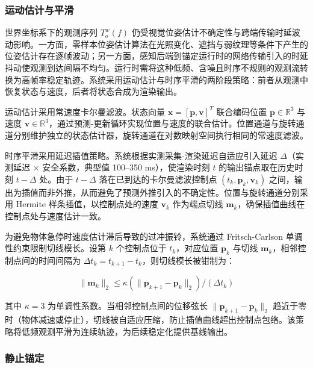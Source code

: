 \documentclass[review]{vgtc}
\begin{document}
\subsubsection{运动估计与平滑}\label{sec:smoothing}


世界坐标系下的观测序列 ${T_o^w (f)}$ 仍受视觉位姿估计不确定性与跨端传输时延波动影响。一方面，零样本位姿估计算法在光照变化、遮挡与弱纹理等条件下产生的位姿估计存在逐帧波动；另一方面，感知后端到锚定运行时的网络传输引入的时延抖动使观测到达间隔不均匀。运行时需将这种低频、含噪且时序不规则的观测流转换为高帧率稳定轨迹。系统采用运动估计与时序平滑的两阶段策略：前者从观测中恢复状态与速度，后者将状态合成为渲染输出。

运动估计采用常速度卡尔曼滤波。状态向量 $\mathbf{x} = [\mathbf{p}, \mathbf{v}]^T$ 联合编码位置 $\mathbf{p} \in \mathbb{R}^3$ 与速度 $\mathbf{v} \in \mathbb{R}^3$，通过预测-更新循环实现位置与速度的联合估计。位置通道与旋转通道分别维护独立的状态估计器，旋转通道在对数映射空间执行相同的常速度滤波。

时序平滑采用延迟插值策略。系统根据实测采集-渲染延迟自适应引入延迟 $\Delta$（实测延迟 $\times$ 安全系数，典型值 100--350 ms），使渲染时刻 $t$ 的输出锚点取在历史时刻 $t - \Delta$ 处。由于 $t - \Delta$ 落在已到达的卡尔曼滤波控制点 ${(t_k, \mathbf{p}_k, \mathbf{v}_k)}$ 之间，输出为插值而非外推，从而避免了预测外推引入的不确定性。位置与旋转通道分别采用 Hermite 样条插值，以控制点处的速度 $\mathbf{v}_k$ 作为端点切线 $\mathbf{m}_k$，确保插值曲线在控制点处与速度估计一致。

为避免物体急停时速度估计滞后导致的过冲振铃，系统通过 Fritsch-Carlson 单调性约束限制切线模长。设第 $k$ 个控制点位于 $t_k$，对应位置 $\mathbf{p}_k$ 与切线 $\mathbf{m}_k$，相邻控制点间的时间间隔为 $\Delta t_k = t_{k+1} - t_k$，则切线模长被钳制为：

\begin{equation}
\lVert \mathbf{m}_k \rVert_2 \leq \kappa (\lVert \mathbf{p}_{k+1} - \mathbf{p}_k \rVert_2) / (\Delta t_k)
\label{eq:tangent-clamp}
\end{equation}


其中 $\kappa = 3$ 为单调性系数。当相邻控制点间的位移弦长 $\lVert \mathbf{p}_{k+1} - \mathbf{p}_k \rVert_2$ 趋近于零时（物体减速或停止），切线被自适应压缩，防止插值曲线超出控制点包络。该策略将低频观测平滑为连续轨迹，为后续稳定化提供基线输出。

\subsubsection{静止锚定}\label{sec:staticlock}
\end{document}
